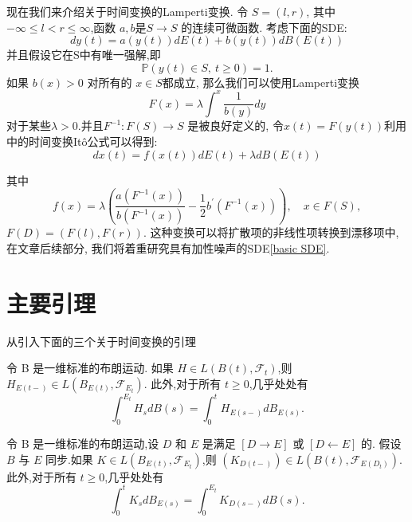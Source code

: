 现在我们来介绍关于时间变换的Lamperti变换. 
令 $S=(l,r)$, 其中 $-\infty\leq l<r\leq\infty$,函数 $a,b$是$S\to S$ 的连续可微函数. 考虑下面的SDE:
\begin{equation}\label{original SDE}
	dy(t)=a(y(t))dE(t)+b(y(t))dB(E(t))
\end{equation}
并且假设它在S中有唯一强解,即
$$\mathbb{P}(y(t)\in S,\:t\geq0)=1.$$
如果 $b(x)>0$ 对所有的 $x\in S$都成立, 那么我们可以使用Lamperti变换
\begin{equation}\label{Lamperti}
	F(x)=\lambda\int^x\frac1{b(y)}dy
\end{equation}
对于某些$\lambda>0.$并且$F^{-1}:F(S)\to S$ 是被良好定义的, 令$x(t)=F(y(t))$利用\cite{umarov2018beyond}中的时间变换It\^{o}公式可以得到:
\begin{equation}\label{basic SDE}
	dx(t)=f(x(t))dE(t) + \lambda dB(E(t)) 
\end{equation}

其中
$$f(x)=\lambda\left(\frac{a(F^{-1}(x))}{b(F^{-1}(x))}-\frac12b^{\prime}(F^{-1}(x))\right),\quad x\in F(S),$$
$F(D)=(F(l),F(r)).$ 这种变换可以将扩散项的非线性项转换到漂移项中, 在文章后续部分, 我们将着重研究具有加性噪声的SDE\cref{basic SDE}.

\section{主要引理}


从\cite{umarov2018beyond}引入下面的三个关于时间变换的引理
\begin{lemma}[第一变量变换公式]\label{first}
	令 B 是一维标准的布朗运动.
	如果 $H \in L(B(t), \mathcal{F}_t)$,则 $H_{E(t-)} \in L(B_{E(t)}, \mathcal{F}_{E_t})$.
	此外,对于所有 $t \geqslant 0$,几乎处处有
	$$
	\int_0^{E_t} H_s dB(s) = \int_0^t H_{E(s-)} dB_{E(s)}.
	$$
\end{lemma}
\begin{lemma}[第二变量变换公式]\label{second}
	令 B 是一维标准的布朗运动,设 $D$ 和 $E$ 是满足 $[D \longrightarrow E]$ 或 $[D \longleftarrow E]$ 的.
	假设 $B$ 与 $E$ 同步.如果 $K \in L(B_{E(t)}, \mathcal{F}_{E_t})$,则 $(K_{D(t-)}) \in L(B(t), \mathcal{F}_{E(D_t)})$.
	此外,对于所有 $t \geqslant 0$,几乎处处有
	$$
	\int_0^t K_s dB_{E(s)} = \int_0^{E_t} K_{D(s-)} dB(s).
	$$
\end{lemma}

